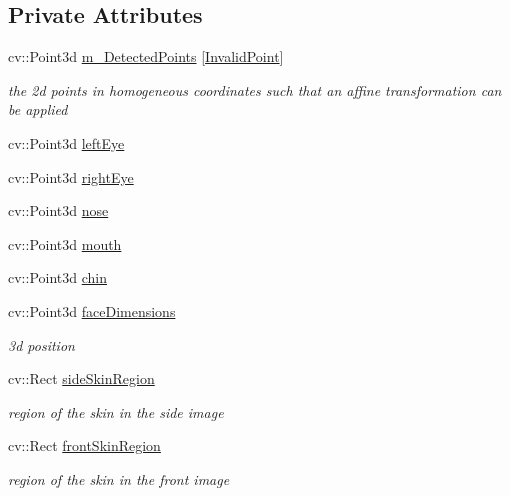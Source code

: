 \subsection*{Private Attributes}
\begin{DoxyCompactItemize}
\item 
cv\+::\+Point3d \hyperlink{class_face3_d_1_1_face_geometry_a695d2f7b17ed80f56f4e6af44c796a9a}{m\+\_\+\+Detected\+Points} \mbox{[}\hyperlink{class_face3_d_1_1_face_geometry_aab597f00966010882927a4974649bf11aef08736c0cf92fe26e5d281571ac319d}{Invalid\+Point}\mbox{]}
\begin{DoxyCompactList}\small\item\em the 2d points in homogeneous coordinates such that an affine transformation can be applied \end{DoxyCompactList}\item 
cv\+::\+Point3d \hyperlink{class_face3_d_1_1_face_geometry_a67446b08935c867d465743452d674f71}{left\+Eye}
\item 
cv\+::\+Point3d \hyperlink{class_face3_d_1_1_face_geometry_a2843e84aaa697a4cd418d1940378955b}{right\+Eye}
\item 
cv\+::\+Point3d \hyperlink{class_face3_d_1_1_face_geometry_a51b5cf29a6deac13aad7ab3ba3858eca}{nose}
\item 
cv\+::\+Point3d \hyperlink{class_face3_d_1_1_face_geometry_a1c36fe81650a276b523d8dc17b30038e}{mouth}
\item 
cv\+::\+Point3d \hyperlink{class_face3_d_1_1_face_geometry_a1c10c36a6624d30328d54b28f2829ac0}{chin}
\item 
cv\+::\+Point3d \hyperlink{class_face3_d_1_1_face_geometry_a41a5f4561198a1296a9d37ad7f562c68}{face\+Dimensions}
\begin{DoxyCompactList}\small\item\em 3d position \end{DoxyCompactList}\item 
cv\+::\+Rect \hyperlink{class_face3_d_1_1_face_geometry_a50fd03eb7de07088b36d3e4dea286b94}{side\+Skin\+Region}
\begin{DoxyCompactList}\small\item\em region of the skin in the side image \end{DoxyCompactList}\item 
cv\+::\+Rect \hyperlink{class_face3_d_1_1_face_geometry_aec3c5ac2a67745348df5aa68651bf616}{front\+Skin\+Region}
\begin{DoxyCompactList}\small\item\em region of the skin in the front image \end{DoxyCompactList}\end{DoxyCompactItemize}



